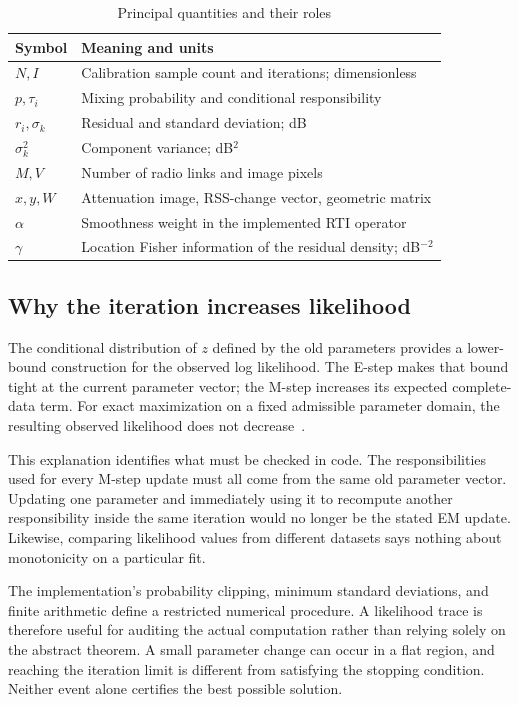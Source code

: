 \documentclass[conference,letterpaper]{IEEEtran}
\begin{document}
\begin{table}[t]
\caption{Principal quantities and their roles}
\label{tab:notation}
\centering\small
\begin{tabular}{@{}p{}p{}@{}}
\toprule
Symbol & Meaning and units\\\midrule
$N,I$ & Calibration sample count and iterations; dimensionless\\
$p,\tau_i$ & Mixing probability and conditional responsibility\\
$r_i,\sigma_k$ & Residual and standard deviation; dB\\
$\sigma_k^2$ & Component variance; dB$^2$\\
$M,V$ & Number of radio links and image pixels\\
$x,y,W$ & Attenuation image, RSS-change vector, geometric matrix\\
$\alpha$ & Smoothness weight in the implemented RTI operator\\
$\gamma$ & Location Fisher information of the residual density; dB$^{-2}$\\
\bottomrule
\end{tabular}
\end{table}

\subsection{Why the iteration increases likelihood}
The conditional distribution of $z$ defined by the old parameters provides a lower-bound construction for the observed log likelihood. The E-step makes that bound tight at the current parameter vector; the M-step increases its expected complete-data term. For exact maximization on a fixed admissible parameter domain, the resulting observed likelihood does not decrease~\cite{dempster1977}.

This explanation identifies what must be checked in code. The responsibilities used for every M-step update must all come from the same old parameter vector. Updating one parameter and immediately using it to recompute another responsibility inside the same iteration would no longer be the stated EM update. Likewise, comparing likelihood values from different datasets says nothing about monotonicity on a particular fit.

The implementation's probability clipping, minimum standard deviations, and finite arithmetic define a restricted numerical procedure. A likelihood trace is therefore useful for auditing the actual computation rather than relying solely on the abstract theorem. A small parameter change can occur in a flat region, and reaching the iteration limit is different from satisfying the stopping condition. Neither event alone certifies the best possible solution.
\end{document}
